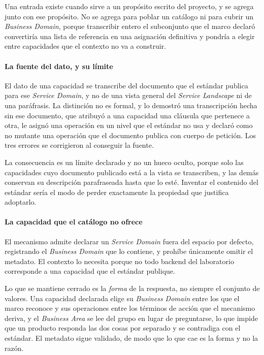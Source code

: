 Una entrada existe cuando sirve a un propósito escrito del proyecto, y se
agrega junto con ese propósito. No se agrega para poblar un catálogo ni para
cubrir un \emph{Business Domain}, porque transcribir entero el subconjunto
que el marco declaró convertiría una lista de referencia en una asignación
definitiva y pondría a elegir entre capacidades que el contexto no va a
construir.

\paragraph*{La fuente del dato, y su límite}

El dato de una capacidad se transcribe del documento que el estándar publica
para ese \emph{Service Domain}, y no de una vista general del
\emph{Service Landscape} ni de una paráfrasis. La distinción no es formal, y lo
demostró una transcripción hecha sin ese documento, que atribuyó a una
capacidad una cláusula que pertenece a otra, le asignó una operación en un
nivel que el estándar no usa y declaró como no mutante una operación que el
documento
publica con cuerpo de petición. Los tres errores se corrigieron al conseguir
la fuente.

La consecuencia es un límite declarado y no un hueco oculto, porque solo las
capacidades cuyo documento publicado está a la vista se transcriben, y las
demás conservan su descripción parafraseada hasta que lo esté. Inventar el
contenido del estándar sería el modo de perder exactamente la propiedad que
justifica adoptarlo.

\paragraph*{La capacidad que el catálogo no ofrece}

El mecanismo admite declarar un \emph{Service Domain} fuera del espacio por
defecto, registrando el \emph{Business Domain} que lo contiene, y prohíbe
únicamente omitir el metadato. El contexto lo necesita porque no todo backend
del laboratorio corresponde a una capacidad que el estándar publique.

Lo que se mantiene cerrado es la \emph{forma} de la respuesta, no siempre el
conjunto de valores. Una capacidad declarada elige su \emph{Business Domain}
entre los que el marco reconoce y sus operaciones entre los términos de
acción que el mecanismo deriva, y el \emph{Business Area} se lee del grupo en
lugar de preguntarse, lo que impide que un producto responda las dos cosas
por separado y se contradiga con el estándar. El metadato sigue validado, de
modo que lo que cae es la forma y no la razón.

